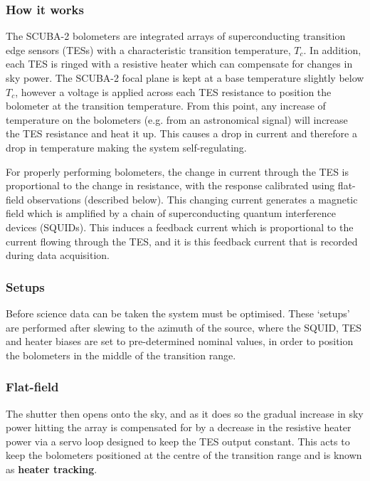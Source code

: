 \documentclass[11pt,oneside,chapters]{starlink}
\begin{document}
\subsubsection{How it works}
The SCUBA-2 bolometers are integrated arrays of superconducting
transition edge sensors (TESs) with a characteristic transition
temperature, $T_c$. In addition, each TES is ringed with a resistive
heater which can compensate for changes in sky power. The SCUBA-2
focal plane is kept at a base temperature slightly below $T_c$,
however a voltage is applied across each TES resistance to position
the bolometer at the transition temperature. From this point, any
increase of temperature on the bolometers (e.g. from an astronomical
signal) will increase the TES resistance and heat it up. This causes a
drop in current and therefore a drop in temperature making the system
self-regulating.

For properly performing bolometers, the change in current through the
TES is proportional to the change in resistance, with the response
calibrated using flat-field observations (described below). This
changing current generates a magnetic field which is amplified by a
chain of superconducting quantum interference devices (SQUIDs). This
induces a feedback current which is proportional to the current
flowing through the TES, and it is this feedback current that is
recorded during data acquisition.


\subsubsection{Setups}

Before science data can be taken the system must be optimised. These
`setups' are performed after slewing to the azimuth of the source,
where the SQUID, TES and heater biases are set to pre-determined
nominal values, in order to position the bolometers in the middle of
the transition range.

\subsubsection{Flat-field}

 The shutter then opens onto the sky, and
as it does so the gradual increase in sky power hitting the array is
compensated for by a decrease in the resistive heater power via a
servo loop designed to keep the TES output constant. This acts to keep
the bolometers positioned at the centre of the transition range and is
known as \textbf{heater tracking}.
\end{document}
